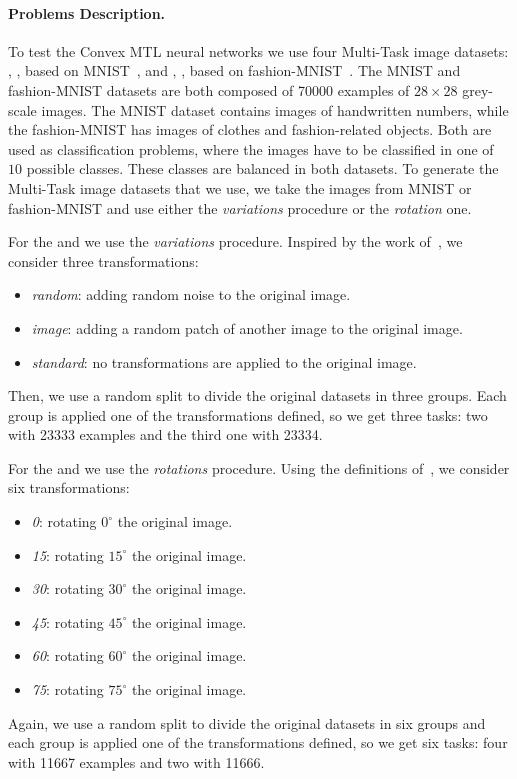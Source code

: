 \paragraph*{Problems Description.\\}
To test the Convex MTL neural networks we use four Multi-Task image datasets:
, , based on MNIST~\citep{LeCunBBH98}, and , , based on fashion-MNIST~\citep{xiao2017}.
%
The MNIST and fashion-MNIST datasets are both composed of \num{70000} examples of $28\times 28$ grey-scale images. The MNIST dataset contains images of handwritten numbers, while the fashion-MNIST has images of clothes and fashion-related objects.
Both are used as classification problems, where the images have to be classified in one of $10$ possible classes. These classes are balanced in both datasets.
%
To generate the Multi-Task image datasets that we use, we take the images from MNIST or fashion-MNIST and use either the \emph{variations} procedure or the \emph{rotation} one.

%
For the  and  we use the \emph{variations} procedure. Inspired by the work of~\cite{BergstraB12}, we consider three transformations:
\begin{itemize}
    \item \textit{random}: adding random noise to the original image.
    \item \textit{image}: adding a random patch of another image to the original image.
    \item \textit{standard}: no transformations are applied to the original image.
\end{itemize}
Then, we use a random split to divide the original datasets in three groups. Each group is applied one of the transformations defined, so we get three tasks: two with \num{23333} examples and the third one with \num{23334}.

%
For the  and  we use the \emph{rotations} procedure. Using the definitions of~\cite{GhifaryKZB15}, we consider six transformations:
\begin{itemize}
    \item \textit{0}: rotating $0^{\circ}$ the original image.
    \item \textit{15}: rotating $15^{\circ}$ the original image.
    \item \textit{30}: rotating $30^{\circ}$ the original image.
    \item \textit{45}: rotating $45^{\circ}$ the original image.
    \item \textit{60}: rotating $60^{\circ}$ the original image.
    \item \textit{75}: rotating $75^{\circ}$ the original image.
\end{itemize}
Again, we use a random split to divide the original datasets in six groups and each group is applied one of the transformations defined, so we get six tasks: four with \num{11667} examples and two with \num{11666}.
%

